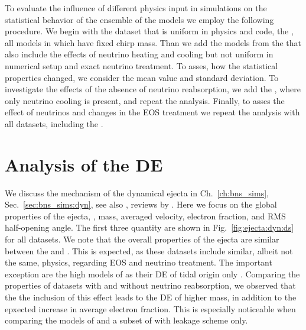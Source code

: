 To evaluate the influence of different physics input in simulations 
on the statistical behavior of the ensemble of the models we employ the following procedure.
%
We begin with the dataset that is uniform in physics and code, the \DSrefset{},
all models in which have fixed chirp mass.
Than we add the models from the \DSheatcool{} that also include the effects of neutrino 
heating and cooling but not uniform in numerical setup and exact neutrino treatment.
To asses, how the statistical properties changed, we consider the mean value and standard deviation.
To investigate the effects of the absence of neutrino reabsorption, we add the \DScool{},  
where only neutrino cooling is present, and repeat the analysis.
Finally, to asses the effect of neutrinos and changes in the \ac{EOS} treatment 
we repeat the analysis with all datasets, including the \DSnone{}.


\section{Analysis of the \ac{DE}}
\label{sec:res_stat_dynej}

We discuss the mechanism of the dynamical ejecta in Ch.~\ref{ch:bns_sims}, 
Sec.~\ref{sec:bns_sims:dyn}, see also \eg, reviews by 
\citet{Radice:2020ddv,Bernuzzi:2020tgt,Shibata:2019wef}. 
%
Here we focus on the global properties of the ejecta, \ie, mass, averaged velocity, 
electron fraction, and \ac{RMS} half-opening angle. The first three quantity are shown in 
Fig.~\ref{fig:ejecta:dyn:ds} for all datasets. We note that the overall properties of the 
ejecta are similar between the \DSrefset{} and \DSheatcool{}. This is expected, as these 
datasets include similar, albeit not the same, physics, regarding \ac{EOS} and neutrino treatment.
The important exception are the high \mr{} models of \DSrefset{} as their \ac{DE} of tidal 
origin only \citep{Bernuzzi:2020txg}.
Comparing the properties of datasets with and without neutrino reabsorption, we observed 
that the the inclusion of this effect leads to the \ac{DE} of higher mass, in addition to 
the epxected increase in average electron fraction. This is especially noticeable when 
comparing the models of \DSrefset{} and a subset of \citet{Radice:2018pdn} with leakage scheme only.

